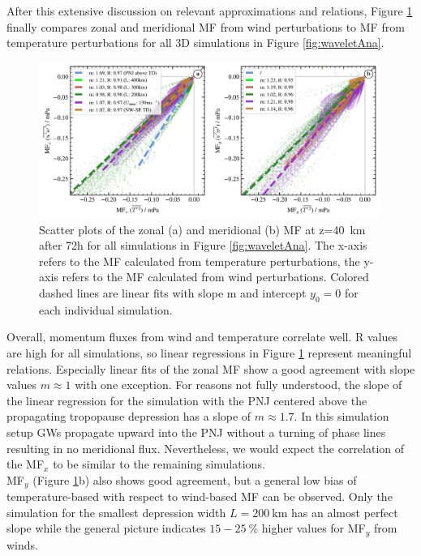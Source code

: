 After this extensive discussion on relevant approximations and relations, Figure \ref{fig:mf_scatter} finally compares zonal and meridional MF from wind perturbations to MF from temperature perturbations for all 3D simulations in Figure \ref{fig:waveletAna}.
\begin{figure}[tbp]
    \centering
    \includegraphics[width=0.99\textwidth]{figures_3D/waveletAna_mf_scatter.png}
    \caption{Scatter plots of the zonal (a) and meridional (b) MF at z=\SI{40}{\kilo\meter} after 72h for all simulations in Figure \ref{fig:waveletAna}. The x-axis refers to the MF calculated from temperature perturbations, the y-axis refers to the MF calculated from wind perturbations. Colored dashed lines are linear fits with slope m and intercept $y_{0}=0$ for each individual simulation.}
    \label{fig:mf_scatter}
\end{figure}
Overall, momentum fluxes from wind and temperature correlate well. R values are high for all simulations, so linear regressions in Figure \ref{fig:mf_scatter} represent meaningful relations. Especially linear fits of the zonal MF show a good agreement with slope values $m \approx 1$ with one exception. For reasons not fully understood, the slope of the linear regression for the simulation with the PNJ centered above the propagating tropopause depression has a slope of $m \approx 1.7$. In this simulation setup GWs propagate upward into the PNJ without a turning of phase lines resulting in no meridional flux. Nevertheless, we would expect the correlation of the MF$_x$ to be similar to the remaining simulations. \\
MF$_y$ (Figure \ref{fig:mf_scatter}b) also shows good agreement, but a general low bias of temperature-based with respect to wind-based MF can be observed. Only the simulation for the smallest depression width $L=\SI{200}{\kilo\meter}$ has an almost perfect slope while the general picture indicates $15-\SI{25}{\percent}$ higher values for MF$_y$ from winds.\\
